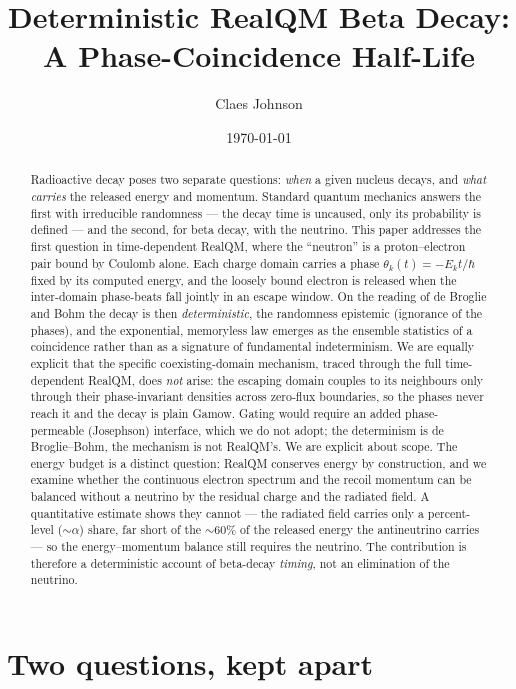 \documentclass[11pt]{article}
\title{Deterministic RealQM Beta Decay:\\
A Phase-Coincidence Half-Life}
\author[1]{Claes Johnson}
\affil[1]{KTH Royal Institute of Technology, SE-100 44 Stockholm, Sweden \\
\texttt{claesjohnson@gmail.com}}
\date{\today}
\begin{document}
\maketitle

\begin{abstract}
Radioactive decay poses two separate questions: \emph{when} a given nucleus decays, and \emph{what carries}
the released energy and momentum. Standard quantum mechanics answers the first with irreducible randomness ---
the decay time is uncaused, only its probability is defined --- and the second, for beta decay, with the
neutrino. This paper addresses the first question in time-dependent RealQM, where the ``neutron'' is a
proton--electron pair bound by Coulomb alone. Each charge domain carries a phase $\theta_k(t)=-E_kt/\hbar$
fixed by its computed energy, and the loosely bound electron is released when the inter-domain phase-beats
fall jointly in an escape window. On the reading of de Broglie and Bohm the decay is then
\emph{deterministic}, the randomness epistemic (ignorance of the phases), and the exponential, memoryless
law emerges as the ensemble statistics of a coincidence rather than as a signature of fundamental
indeterminism. We are equally explicit that the specific coexisting-domain
mechanism, traced through the full time-dependent RealQM, does \emph{not} arise: the escaping domain couples
to its neighbours only through their phase-invariant densities across zero-flux boundaries, so the phases
never reach it and the decay is plain Gamow. Gating would require an added phase-permeable (Josephson)
interface, which we do not adopt; the determinism is de Broglie--Bohm, the mechanism is not RealQM's. We are explicit about scope. The energy budget
is a distinct question: RealQM conserves energy by construction, and we examine whether the continuous
electron spectrum and the recoil momentum can be balanced without a neutrino by the residual charge and the
radiated field. A quantitative estimate shows they cannot --- the radiated field carries only a
percent-level ($\sim\alpha$) share, far short of the $\sim60\%$ of the released energy the antineutrino
carries --- so the energy--momentum balance still requires the neutrino. The contribution is therefore a
deterministic account of beta-decay \emph{timing}, not an elimination of the neutrino.
\end{abstract}


\section{Two questions, kept apart}
\label{sec:two}
\end{document}
